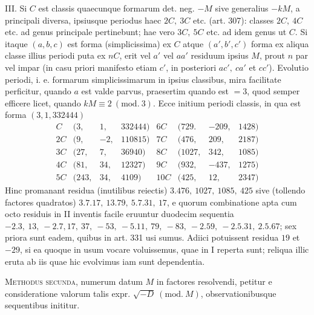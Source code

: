 III. Si \(C\) est classis quaecunque formarum det. neg. \(-M\) sive generalius \(-kM\), a principali diversa, ipsiusque periodus haec \(2C,\allowbreak \ 3C\) etc. (art. 307): classes \(2C,\allowbreak \ 4C\) etc. ad genus principale pertinebunt; hae vero \(3C,\allowbreak \ 5C\) etc. ad idem genus ut \(C\). Si itaque \((a,\allowbreak b,\allowbreak c)\) est forma (simplicissima) ex \(C\) atque \((a',\allowbreak b',\allowbreak c')\) forma ex aliqua classe illius periodi puta ex \(nC\), erit vel \(a'\) vel \(aa'\) residuum ipsius \(M\), prout \(n\) par vel impar (in casu priori manifesto etiam \(c'\), in posteriori \(ac',\allowbreak \ ca'\) et \(cc'\)). Evolutio periodi, i. e. formarum simplicissimarum in ipsius classibus, mira facilitate perficitur, quando \(a\) est valde parvus, praesertim quando est \(=3\), quod semper efficere licet, quando \(kM\equiv2\ (\mathrm{mod.}\ 3)\). Ecce initium periodi classis, in qua est forma \((3,\allowbreak 1,\allowbreak 332444)\)
\[\begin{array}{crrr|crrr}C&\bigl(3,&1,&332444\bigr)&6C&\bigl(729.&-209,&1428\bigr)\\ 2C&\bigl(9,&-2,&110815\bigr)&7C&\bigl(476,&209,&2187\bigr)\\ 3C&\bigl(27,&7,&36940\bigr)&8C&\bigl(1027,&342,&1085\bigr)\\ 4C&\bigl(81,&34,&12327\bigr)&9C&\bigl(932,&-437,&1275\bigr)\\ 5C&\bigl(243,&34,&4109\bigr)&10C&\bigl(425,&12,&2347\bigr)\end{array}\] Hinc promanant residua (inutilibus reiectis) \(3.476,\allowbreak \ 1027,\allowbreak \ 1085,\allowbreak \ 425\) sive (tollendo factores quadratos) \(3.7.17,\allowbreak \ 13.79,\allowbreak \ 5.7.31,\allowbreak \ 17\), e quorum combinatione apta cum octo residuis in II inventis facile eruuntur duodecim sequentia \(-2.3,\allowbreak \ 13,\allowbreak \ -2.7,\allowbreak 17,\allowbreak \ 37,\allowbreak \ -53,\allowbreak \ -5.11,\allowbreak \ 79,\allowbreak \ -83,\allowbreak \ -2.59,\allowbreak \ -2.5.31,\allowbreak \ 2.5.67\); sex priora sunt eadem, quibus in art. 331 usi sumus. Adiici potuissent residua \(19\) et \(-29\), si ea quoque in usum vocare voluissemus, quae in I reperta sunt; reliqua illic eruta ab iis quae hic evolvimus iam sunt dependentia.

\textsc{Methodus secunda}, numerum datum \(M\) in factores resolvendi, petitur e consideratione valorum talis expr. \(\surd{-D}\ (\mathrm{mod.}\ M)\), observationibusque sequentibus inititur.

